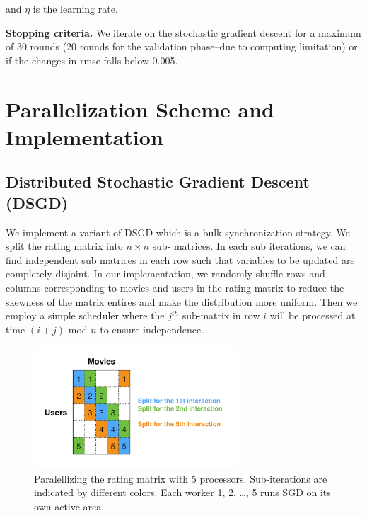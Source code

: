 \documentclass{article} %
\begin{document}
\begin{center}
and $\eta$ is the learning rate.
\end{center}

\textbf{Stopping criteria.}   We iterate on the stochastic gradient descent
for a maximum of 30 rounds (20 rounds for the validation phase--due to
computing limitation)   or if the changes in rmse falls below 0.005.

\section{Parallelization Scheme and Implementation}


\subsection{Distributed Stochastic Gradient Descent (DSGD)}

We implement a variant of DSGD\cite{gemulla2011large} which is a bulk
synchronization strategy. We split the rating matrix into $n \times n$ sub-
matrices. In each sub iterations, we can find independent sub matrices in each
row such that variables to be updated are completely disjoint. In our
implementation, we randomly shuffle rows and columns corresponding to movies
and users in the rating matrix to reduce the skewness of the matrix entires
and make the distribution more uniform. Then we employ a simple scheduler
where the $j^{th}$ sub-matrix in row $i$ will be processed at time $(i+j)$ mod
$n$ to ensure independence.

\begin{figure}[h]
\centering
\includegraphics[width=3in]{figures/split.pdf}
\caption{\label{fig:split} Paralellizing the rating matrix with 5 processors. Sub-iterations are indicated by different colors. Each worker 1, 2, \ldots, 5 runs SGD on its own active area. }
\end{figure}
\end{document}
